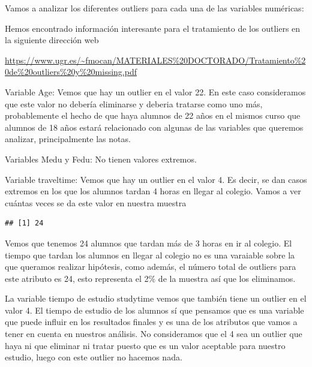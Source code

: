 \documentclass[]{article}
\newenvironment{Shaded}{\begin{snugshade}}{\end{snugshade}}
\newcommand{\DecValTok}[1]{\textcolor[rgb]{0.86,0.86,0.80}{#1}}
\newcommand{\KeywordTok}[1]{\textcolor[rgb]{0.94,0.87,0.69}{#1}}
\newcommand{\NormalTok}[1]{\textcolor[rgb]{0.80,0.80,0.80}{#1}}
\newcommand{\OperatorTok}[1]{\textcolor[rgb]{0.94,0.94,0.82}{#1}}
\newcommand{\StringTok}[1]{\textcolor[rgb]{0.80,0.58,0.58}{#1}}
\begin{document}
Vamos a analizar los diferentes outliers para cada una de las variables
numéricas:

Hemos encontrado información interesante para el tratamiento de los
outliers en la siguiente dirección web

\url{https://www.ugr.es/~fmocan/MATERIALES\%20DOCTORADO/Tratamiento\%20de\%20outliers\%20y\%20missing.pdf}

Variable Age: Vemos que hay un outlier en el valor 22. En este caso
consideramos que este valor no debería eliminarse y deberia tratarse
como uno más, probablemente el hecho de que haya alumnos de 22 años en
el mismos curso que alumnos de 18 años estará relacionado con algunas de
las variables que queremos analizar, principalmente las notas.

Variables Medu y Fedu: No tienen valores extremos.

Variable traveltime: Vemos que hay un outlier en el valor 4. Es decir,
se dan casos extremos en los que los alumnos tardan 4 horas en llegar al
colegio. Vamos a ver cuántas veces se da este valor en nuestra muestra

\begin{Shaded}
\end{Shaded}

\begin{verbatim}
## [1] 24
\end{verbatim}

Vemos que tenemos 24 alumnos que tardan más de 3 horas en ir al colegio.
El tiempo que tardan los alumnos en llegar al colegio no es una
varaiable sobre la que queramos realizar hipótesis, como además, el
número total de outliers para este atributo es 24, esto representa el
2\% de la muestra así que los eliminamos.

\begin{Shaded}
\end{Shaded}

La variable tiempo de estudio studytime vemos que también tiene un
outlier en el valor 4. El tiempo de estudio de los alumnos sí que
pensamos que es una variable que puede influir en los resultados finales
y es una de los atributos que vamos a tener en cuenta en nuestros
análisis. No consideramos que el 4 sea un outlier que haya ni que
eliminar ni tratar puesto que es un valor aceptable para nuestro
estudio, luego con este outlier no hacemos nada.
\end{document}
